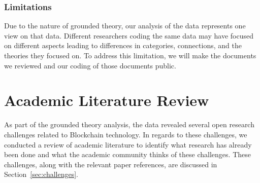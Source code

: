 \subsubsection{Limitations}
Due to the nature of grounded theory, our analysis of the data represents one view on that data.
Different researchers coding the same data may have focused on different aspects leading to differences in categories, connections, and the theories they focused on.
To address this limitation, we will make the documents we reviewed and our coding of those documents public.

\section{Academic Literature Review}
As part of the grounded theory analysis, the data revealed several open research challenges related to Blockchain technology.
In regards to these challenges, we conducted a review of academic literature to identify what research has already been done and what the academic community thinks of these challenges.
These challenges, along with the relevant paper references, are discussed in Section~\ref{sec:challenges}.